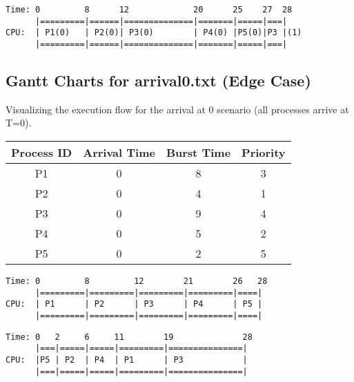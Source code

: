 \documentclass[12pt]{article}
\begin{document}
\begin{lstlisting}[style=ganttstyle, caption={Gantt Chart: MLFQ (basic\_test.txt) Queue number in parentheses}, label={lst:gantt_mlfq}]
Time: 0         8      12             20      25    27  28
      |=========|======|==============|=======|=====|===|
CPU:  | P1(0)   | P2(0)| P3(0)        | P4(0) |P5(0)|P3 |(1)
      |=========|======|==============|=======|=====|===|
\end{lstlisting}

\subsection{Gantt Charts for arrival0.txt (Edge Case)}

Visualizing the execution flow for the arrival at 0 scenario (all processes arrive at T=0).

\begin{center}
\begin{tabular}{cccc}
\toprule
Process ID & Arrival Time & Burst Time & Priority \\
\midrule
 P1         & 0            & 8          & 3        \\
 P2         & 0            & 4          & 1        \\
 P3         & 0            & 9          & 4        \\
 P4         & 0            & 5          & 2        \\
 P5         & 0            & 2          & 5        \\
\bottomrule
\end{tabular}
\end{center}

\begin{lstlisting}[style=ganttstyle, caption={Gantt Chart: FCFS (arrival0.txt)}, label={lst:gantt_fcfs_arrival0}]
Time: 0         8         12        21        26   28
      |=========|=========|=========|=========|====|
CPU:  | P1      | P2      | P3      | P4      | P5 |
      |=========|=========|=========|=========|====|
\end{lstlisting}

\begin{lstlisting}[style=ganttstyle, caption={Gantt Chart: SJF - Non-Preemptive (arrival0.txt)}, label={lst:gantt_sjfnp_arrival0}]
Time: 0   2     6     11        19              28
      |===|=====|=====|=========|===============|
CPU:  |P5 | P2  | P4  | P1      | P3            |
      |===|=====|=====|=========|===============|
\end{lstlisting}
\end{document}
